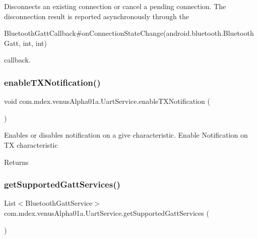 Disconnects an existing connection or cancel a pending connection. The disconnection result is reported asynchronously through the 
\begin{DoxyCode}
BluetoothGattCallback#onConnectionStateChange(android.bluetooth.BluetoothGatt, \textcolor{keywordtype}{int}, \textcolor{keywordtype}{int}) 
\end{DoxyCode}
 callback. \mbox{\label{classcom_1_1mdex_1_1venus_alpha01a_1_1_uart_service_a18292c82804f4c2d4683cc5bda145076}} 
\subsubsection{\texorpdfstring{enable\+T\+X\+Notification()}{enableTXNotification()}}
{\footnotesize\ttfamily void com.\+mdex.\+venus\+Alpha01a.\+Uart\+Service.\+enable\+T\+X\+Notification (\begin{DoxyParamCaption}{ }\end{DoxyParamCaption})}

Enables or disables notification on a give characteristic. Enable Notification on TX characteristic

\begin{DoxyReturn}{Returns}

\end{DoxyReturn}
\mbox{\label{classcom_1_1mdex_1_1venus_alpha01a_1_1_uart_service_a8e61c0f9da4f1ad3f2f0d06ca9e09f26}} 
\subsubsection{\texorpdfstring{get\+Supported\+Gatt\+Services()}{getSupportedGattServices()}}
{\footnotesize\ttfamily List$<$Bluetooth\+Gatt\+Service$>$ com.\+mdex.\+venus\+Alpha01a.\+Uart\+Service.\+get\+Supported\+Gatt\+Services (\begin{DoxyParamCaption}{ }\end{DoxyParamCaption})}

